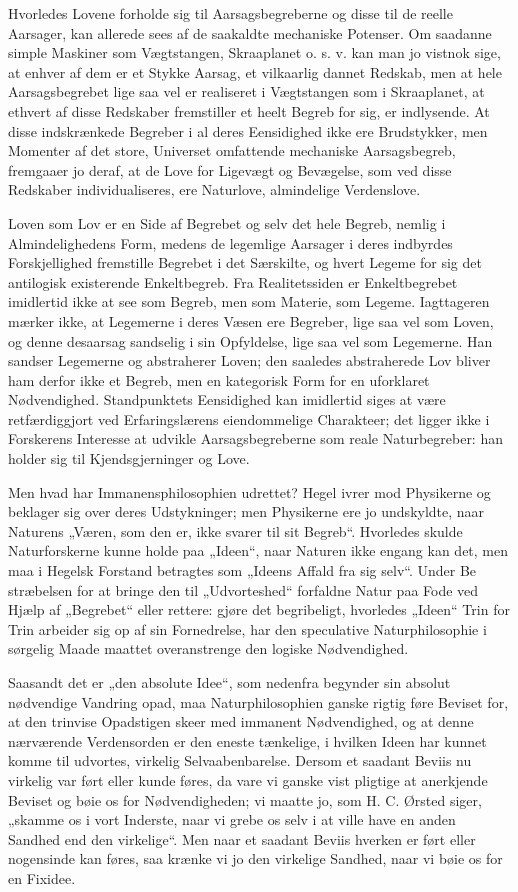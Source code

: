 \documentclass[12pt,a4paper]{book}
\begin{document}
Hvorledes Lovene forholde sig til Aarsagsbegreberne og disse til de
reelle Aarsager, kan allerede sees af de saakaldte mechaniske Potenser.
Om saadanne simple Maskiner som Vægtstangen, Skraaplanet o. s. v. kan man
jo vistnok
sige, at enhver af dem er et Stykke Aarsag, et vilkaarlig dannet Redskab,
men at hele Aarsagsbegrebet lige saa vel er realiseret i Vægtstangen som
i Skraaplanet, at ethvert af disse Redskaber fremstiller et heelt Begreb
for sig, er indlysende. At disse indskrænkede Begreber i al deres
Eensidighed ikke ere Brudstykker, men Momenter af det store, Universet
omfattende mechaniske Aarsagsbegreb, fremgaaer jo deraf, at de Love for
Ligevægt og Bevægelse, som ved disse Redskaber individualiseres, ere
Naturlove, almindelige Verdenslove.

Loven som Lov er en Side af Begrebet og selv det hele Begreb, nemlig i
Almindelighedens Form, medens de legemlige Aarsager i deres indbyrdes
Forskjellighed fremstille Begrebet i det Særskilte, og hvert Legeme for
sig det antilogisk existerende Enkeltbegreb. Fra Realitetssiden er
Enkeltbegrebet imidlertid ikke at see som Begreb, men som Materie, som
Legeme. Iagttageren mærker ikke, at Legemerne i deres Væsen ere Begreber,
lige saa vel som Loven, og denne desaarsag sandselig i sin Opfyldelse,
lige saa vel som Legemerne. Han sandser Legemerne og abstraherer Loven;
den saaledes abstraherede Lov bliver ham derfor ikke et Begreb, men en
kategorisk Form for en uforklaret Nødvendighed. Standpunktets Eensidighed
kan imidlertid siges at være retfærdiggjort ved Erfaringslærens
eiendommelige Charakteer; det ligger ikke i Forskerens Interesse at
udvikle Aarsagsbegreberne som reale Naturbegreber: han holder sig til
Kjendsgjerninger og Love.

Men hvad har Immanensphilosophien udrettet? Hegel ivrer mod Physikerne og
beklager sig over deres Udstykninger; men Physikerne ere jo undskyldte,
naar Naturens „Væren, som den er, ikke svarer til sit Begreb“. Hvorledes
skulde Naturforskerne kunne holde paa „Ideen“, naar Naturen ikke engang
kan det, men maa i Hegelsk Forstand betragtes som „Ideens Affald fra sig
selv“. Under Be\-%
stræbelsen for at bringe den til „Udvorteshed“ forfaldne Natur paa Fode
ved Hjælp af „Begrebet“ eller rettere: gjøre det begribeligt, hvorledes
„Ideen“ Trin for Trin arbeider sig op af sin Fornedrelse, har den
speculative Naturphilosophie i sørgelig Maade maattet overanstrenge den
logiske Nødvendighed.

Saasandt det er „den absolute Idee“, som nedenfra begynder sin absolut
nødvendige Vandring opad, maa Naturphilosophien ganske rigtig føre
Beviset for, at den trinvise Opadstigen skeer med immanent Nødvendighed,
og at denne nærværende Verdensorden er den eneste tænkelige, i hvilken
Ideen har kunnet komme til udvortes, virkelig Selvaabenbarelse. Dersom et
saadant Beviis nu virkelig var ført eller kunde føres, da vare vi ganske
vist pligtige at anerkjende Beviset og bøie os for Nødvendigheden; vi
maatte jo, som H. C. Ørsted siger, „skamme os i vort Inderste, naar vi
grebe os selv i at ville have en anden Sandhed end den virkelige“. Men
naar et saadant Beviis hverken er ført eller nogensinde kan føres, saa
krænke vi jo den virkelige Sandhed, naar vi bøie os for en Fixidee.
\end{document}
